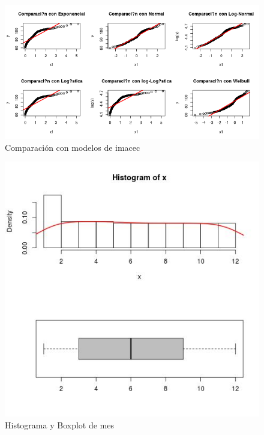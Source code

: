 \documentclass{article}
\begin{document}
\begin{figure}[h!]
\centering
\includegraphics[scale=0.5]{./plots/cm_imacec.png}
\caption{Comparación con modelos de imacec}
\end{figure}
\pagebreak
\begin{figure}[h!]
\centering
\includegraphics[scale=0.5]{./plots/histplot_mes.png}
\caption{Histograma y Boxplot de mes}
\end{figure}
\end{document}

